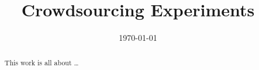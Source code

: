 \documentclass{ecsreport}      %
\begin{document}
\frontmatter
\title      {Crowdsourcing Experiments}
\addresses  {\groupname\\\deptname\\\univname}
\date       {\today}
\subject    {}
\keywords   {}
\maketitle
\begin{abstract}
This work is all about \dots
\end{abstract}
\tableofcontents
\listoffigures
\listoftables

\newcommand{\funcx}{\ensuremath{f(x)}}
\newcommand{\probx}{\ensuremath{p(x)}}
\newcommand{\propx}{\ensuremath{q(x)}}
\newcommand{\expectation}[1]{\ensuremath{\mathbb{E}[#1]}}
\newcommand{\sample}[2][x]{\ensuremath{#1^{(#2)}}}
\newcommand{\approxiw}[2][x]{\ensuremath{\tilde{w}(\sample[#1]{#2})}}
\newcommand{\normiw}[2][x]{\ensuremath{\ensuremath{w(\sample[#1]{#2})}}}





\mainmatter






\appendix

\backmatter


\end{document}
